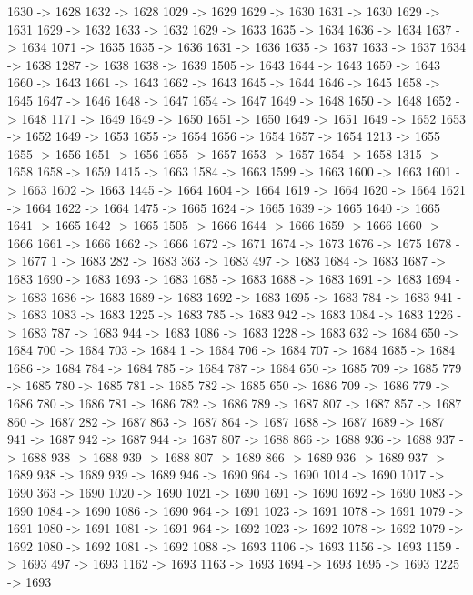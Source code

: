 {	1630 -> 1628
	1632 -> 1628
	1029 -> 1629
	1629 -> 1630
	1631 -> 1630
	1629 -> 1631
	1629 -> 1632
	1633 -> 1632
	1629 -> 1633
	1635 -> 1634
	1636 -> 1634
	1637 -> 1634
	1071 -> 1635
	1635 -> 1636
	1631 -> 1636
	1635 -> 1637
	1633 -> 1637
	1634 -> 1638
	1287 -> 1638
	1638 -> 1639
	1505 -> 1643
	1644 -> 1643
	1659 -> 1643
	1660 -> 1643
	1661 -> 1643
	1662 -> 1643
	1645 -> 1644
	1646 -> 1645
	1658 -> 1645
	1647 -> 1646
	1648 -> 1647
	1654 -> 1647
	1649 -> 1648
	1650 -> 1648
	1652 -> 1648
	1171 -> 1649
	1649 -> 1650
	1651 -> 1650
	1649 -> 1651
	1649 -> 1652
	1653 -> 1652
	1649 -> 1653
	1655 -> 1654
	1656 -> 1654
	1657 -> 1654
	1213 -> 1655
	1655 -> 1656
	1651 -> 1656
	1655 -> 1657
	1653 -> 1657
	1654 -> 1658
	1315 -> 1658
	1658 -> 1659
	1415 -> 1663
	1584 -> 1663
	1599 -> 1663
	1600 -> 1663
	1601 -> 1663
	1602 -> 1663
	1445 -> 1664
	1604 -> 1664
	1619 -> 1664
	1620 -> 1664
	1621 -> 1664
	1622 -> 1664
	1475 -> 1665
	1624 -> 1665
	1639 -> 1665
	1640 -> 1665
	1641 -> 1665
	1642 -> 1665
	1505 -> 1666
	1644 -> 1666
	1659 -> 1666
	1660 -> 1666
	1661 -> 1666
	1662 -> 1666
	1672 -> 1671
	1674 -> 1673
	1676 -> 1675
	1678 -> 1677
	1 -> 1683
	282 -> 1683
	363 -> 1683
	497 -> 1683
	1684 -> 1683
	1687 -> 1683
	1690 -> 1683
	1693 -> 1683
	1685 -> 1683
	1688 -> 1683
	1691 -> 1683
	1694 -> 1683
	1686 -> 1683
	1689 -> 1683
	1692 -> 1683
	1695 -> 1683
	784 -> 1683
	941 -> 1683
	1083 -> 1683
	1225 -> 1683
	785 -> 1683
	942 -> 1683
	1084 -> 1683
	1226 -> 1683
	787 -> 1683
	944 -> 1683
	1086 -> 1683
	1228 -> 1683
	632 -> 1684
	650 -> 1684
	700 -> 1684
	703 -> 1684
	1 -> 1684
	706 -> 1684
	707 -> 1684
	1685 -> 1684
	1686 -> 1684
	784 -> 1684
	785 -> 1684
	787 -> 1684
	650 -> 1685
	709 -> 1685
	779 -> 1685
	780 -> 1685
	781 -> 1685
	782 -> 1685
	650 -> 1686
	709 -> 1686
	779 -> 1686
	780 -> 1686
	781 -> 1686
	782 -> 1686
	789 -> 1687
	807 -> 1687
	857 -> 1687
	860 -> 1687
	282 -> 1687
	863 -> 1687
	864 -> 1687
	1688 -> 1687
	1689 -> 1687
	941 -> 1687
	942 -> 1687
	944 -> 1687
	807 -> 1688
	866 -> 1688
	936 -> 1688
	937 -> 1688
	938 -> 1688
	939 -> 1688
	807 -> 1689
	866 -> 1689
	936 -> 1689
	937 -> 1689
	938 -> 1689
	939 -> 1689
	946 -> 1690
	964 -> 1690
	1014 -> 1690
	1017 -> 1690
	363 -> 1690
	1020 -> 1690
	1021 -> 1690
	1691 -> 1690
	1692 -> 1690
	1083 -> 1690
	1084 -> 1690
	1086 -> 1690
	964 -> 1691
	1023 -> 1691
	1078 -> 1691
	1079 -> 1691
	1080 -> 1691
	1081 -> 1691
	964 -> 1692
	1023 -> 1692
	1078 -> 1692
	1079 -> 1692
	1080 -> 1692
	1081 -> 1692
	1088 -> 1693
	1106 -> 1693
	1156 -> 1693
	1159 -> 1693
	497 -> 1693
	1162 -> 1693
	1163 -> 1693
	1694 -> 1693
	1695 -> 1693
	1225 -> 1693
}
